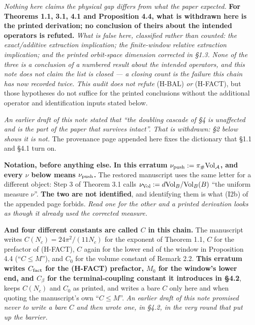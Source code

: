 \documentclass[11pt]{article}
\newcommand{\A}{\mathcal A}
\begin{document}
\emph{Nothing here claims the physical gap differs from what the paper expected.}
\textbf{For Theorems 1.1, 3.1, 4.1 and Proposition 4.4, what is withdrawn here is the
printed derivation; no conclusion of theirs about the intended operators is refuted.}
\emph{What is false here, classified rather than counted: the exact/additive
extraction implication; the \mbox{finite-window} relative extraction implication; and the
printed orbit-space dimension corrected in \S1.3. None of the three is a conclusion of
a numbered result about the intended operators, and this note does not claim the list
is closed --- a closing count is the failure this chain has now recorded twice.}
\emph{This audit does not
refute} (H-BAL) \emph{or} (H-FACT), but those hypotheses do not suffice for the
printed conclusions without the additional operator and identification inputs stated
below.

\emph{An earlier draft of this note stated that ``the doubling cascade of \S4 is
unaffected and is the part of the paper that survives intact''. That is withdrawn:
\S2 below shows it is not.} The provenance page appended here fixes the dictionary
that \S1.1 and \S4.1 turn on.

\noindent\textbf{Notation, before anything else.} \textbf{In this erratum $\nu_{\rm push}:=\pi_\#\mathrm{Vol}_{\A}$, and every $\nu$ below means $\nu_{\rm push}$.} The restored manuscript uses the same letter for a different object: Step 3 of Theorem 3.1 calls $\nu_{\rm Vol}:=d\mathrm{Vol}_B/\mathrm{Vol}_B(B)$ ``the uniform measure $\nu$''. \textbf{The two are not identified}, and identifying them is what (I2b) of the appended page forbids. \emph{Read one for the other and a printed derivation looks as though it already used the corrected measure.}

\noindent\textbf{And four different constants are called $C$ in this chain.} The
manuscript writes $C(N_c)=24\pi^2/(11N_c)$ for the exponent of Theorem 1.1, $C$ for the
prefactor of (H-FACT), $C$ again for the lower end of the window in Proposition 4.4
(``$C\le M$''), and $C_0$ for the volume constant of Remark 2.2. \textbf{This erratum
writes $C_{\rm fact}$ for the (H-FACT) prefactor, $M_0$ for the window's lower end, and
$C_\beta$ for the terminal-coupling constant it introduces in \S4.2}, keeps $C(N_c)$ and
$C_0$ as printed, and writes a bare $C$ only here and when quoting the manuscript's own
``$C\le M$''. \emph{An earlier draft of this note promised never to write a bare $C$ and
then wrote one, in \S4.2, in the very round that put up the barrier.}
\end{document}
